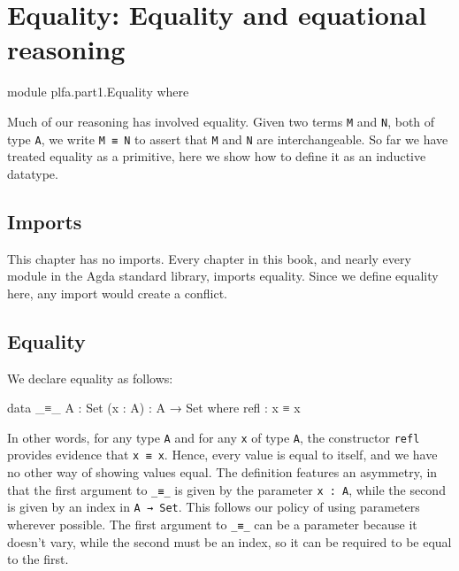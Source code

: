 \hypertarget{Equality}{%
\chapter{Equality: Equality and equational reasoning}\label{Equality}}

\begin{fence}
\begin{code}
module plfa.part1.Equality where
\end{code}
\end{fence}

Much of our reasoning has involved equality. Given two terms \texttt{M}
and \texttt{N}, both of type \texttt{A}, we write \texttt{M\ ≡\ N} to
assert that \texttt{M} and \texttt{N} are interchangeable. So far we
have treated equality as a primitive, here we show how to define it as
an inductive datatype.

\hypertarget{imports}{%
\section{Imports}\label{imports}}

This chapter has no imports. Every chapter in this book, and nearly
every module in the Agda standard library, imports equality. Since we
define equality here, any import would create a conflict.

\hypertarget{equality}{%
\section{Equality}\label{equality}}

We declare equality as follows:

\begin{fence}
\begin{code}
data _≡_ {A : Set} (x : A) : A → Set where
  refl : x ≡ x
\end{code}
\end{fence}

In other words, for any type \texttt{A} and for any \texttt{x} of type
\texttt{A}, the constructor \texttt{refl} provides evidence that
\texttt{x\ ≡\ x}. Hence, every value is equal to itself, and we have no
other way of showing values equal. The definition features an asymmetry,
in that the first argument to \texttt{\_≡\_} is given by the parameter
\texttt{x\ :\ A}, while the second is given by an index in
\texttt{A\ →\ Set}. This follows our policy of using parameters wherever
possible. The first argument to \texttt{\_≡\_} can be a parameter
because it doesn't vary, while the second must be an index, so it can be
required to be equal to the first.

